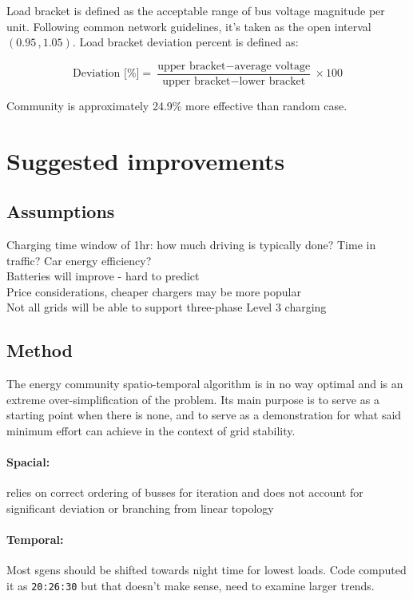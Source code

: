 \documentclass[a4paper,10pt]{report}
\begin{document}
Load bracket is defined as the acceptable range of bus voltage magnitude per unit. Following common network guidelines, it's taken as the open interval $(0.95\,, 1.05)$. Load bracket deviation percent is defined as:

\begin{equation}
	\text{Deviation [\%]} = \frac{\text{upper bracket} - \text{average voltage}}{\text{upper bracket}-\text{lower bracket}}\times 100
\end{equation}

Community is approximately 24.9\% more effective than random case.

\section{Suggested improvements}\label{section_improvements}
\subsection{Assumptions}
Charging time window of 1hr: how much driving is typically done? Time in traffic? Car energy efficiency?\\
Batteries will improve - hard to predict\\
Price considerations, cheaper chargers may be more popular\\
Not all grids will be able to support three-phase Level 3 charging\\


\subsection{Method}
The energy community spatio-temporal algorithm is in no way optimal and is an extreme over-simplification of the problem. Its main purpose is to serve as a starting point when there is none, and to serve as a demonstration for what said minimum effort can achieve in the context of grid stability.\\

\paragraph{Spacial:} relies on correct ordering of busses for iteration and does not account for significant deviation or branching from linear topology\\

\paragraph{Temporal:} Most sgens should be shifted towards night time for lowest loads. Code computed it as \texttt{20:26:30} but that doesn't make sense, need to examine larger trends.
\end{document}
